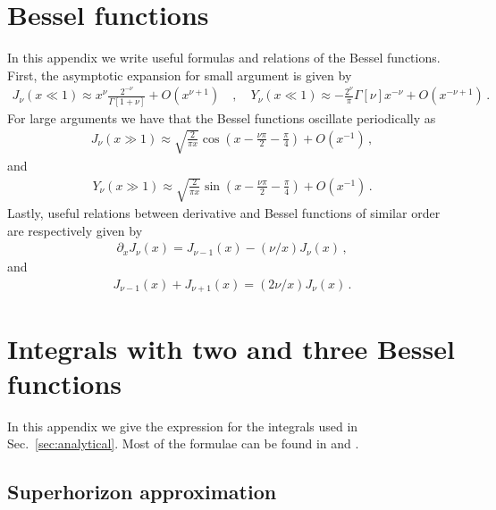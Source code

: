 \documentclass[a4paper,11pt]{article}
\numberwithin{equation}{section}
\begin{document}
\section{Bessel functions \label{app:bessel}}
In this appendix  we write useful formulas and relations of the Bessel functions. First, the asymptotic expansion for small argument is given by
\begin{align}
{J_\nu(x\ll1)}\approx x^\nu\frac{2^{-\nu}}{\Gamma[1+\nu]}+O(x^{\nu+1})
\quad,\quad
{Y_\nu(x\ll1)}\approx-\frac{2^{\nu}}{\pi}{\Gamma[\nu]}x^{-\nu}+O(x^{-\nu+1})\,.
\end{align}
 For large arguments we have that the Bessel functions oscillate periodically as
\begin{align}
{J_\nu(x\gg1)}\approx\sqrt{\frac{2}{\pi x}}\cos\left(x-\frac{\nu\pi}{2}-\frac{\pi}{4}\right)+O(x^{-1})\,,
\end{align}
and
\begin{align}
{Y_\nu(x\gg1)}\approx\sqrt{\frac{2}{\pi x}}\sin\left(x-\frac{\nu\pi}{2}-\frac{\pi}{4}\right)+O(x^{-1})\,.
\end{align}
Lastly, useful relations between derivative and Bessel functions of similar order are respectively given by
\begin{align}
\partial_x{J}_{\nu}\left(x\right)={J}_{\nu-1}\left(x\right)-(\nu/x)%
{J}_{\nu}\left(x\right)\,,
\end{align}
and
\begin{align}
{J}_{\nu-1}\left(x\right)+{J}_{\nu+1}\left(x\right)=(2\nu/x)%
{J}_{\nu}\left(x\right)\,.
\end{align}



\section{Integrals with two and three Bessel functions \label{app:integralbessel}}

In this appendix we give the expression for the integrals used in Sec.~\ref{sec:analytical}. Most of the formulae can be found in \cite{threebesselI} and \cite{NIST:DLMF}.

\subsection{Superhorizon approximation}
\end{document}
